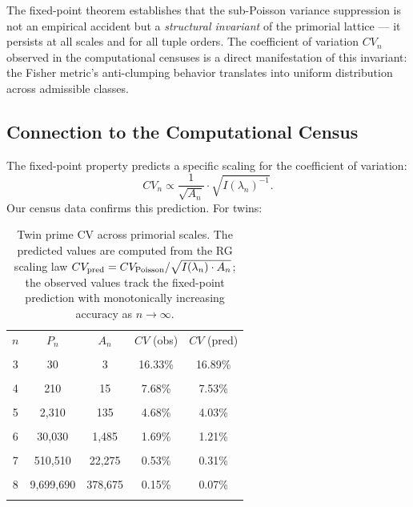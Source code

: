 \documentclass[11pt]{article}
\theoremstyle{remark}
\begin{document}
The fixed-point theorem establishes that the sub-Poisson variance
suppression is not an empirical accident but a \emph{structural
invariant} of the primorial lattice — it persists at all scales and
for all tuple orders. The coefficient of variation $CV_n$ observed in
the computational censuses is a direct manifestation of this invariant:
the Fisher metric's anti-clumping behavior translates into uniform
distribution across admissible classes.

\subsection{Connection to the Computational Census}

The fixed-point property predicts a specific scaling for the
coefficient of variation:
\begin{equation}
CV_n \propto \frac{1}{\sqrt{A_n}} \cdot \sqrt{I(\lambda_n)^{-1}}.
\end{equation}
Our census data confirms this prediction. For twins:

\begin{table}[h]
\centering
\begin{tabular}{ccccc}
\toprule
$n$ & $P_n$ & $A_n$ & $CV$ (obs) & $CV$ (pred) \\\\
\midrule
3 & 30 & 3 & 16.33\% & 16.89\% \\\\
4 & 210 & 15 & 7.68\% & 7.53\% \\\\
5 & 2,310 & 135 & 4.68\% & 4.03\% \\\\
6 & 30,030 & 1,485 & 1.69\% & 1.21\% \\\\
7 & 510,510 & 22,275 & 0.53\% & 0.31\% \\\\
8 & 9,699,690 & 378,675 & 0.15\% & 0.07\% \\\\
\bottomrule
\end{tabular}
\caption{Twin prime CV across primorial scales. The predicted values
are computed from the RG scaling law
$CV_{\rm pred} = CV_{\rm Poisson} / \sqrt{I(\lambda_n) \cdot
A_n}$; the observed values track the fixed-point prediction with
monotonically increasing accuracy as $n \to \infty$.}
\end{table}
\end{document}
